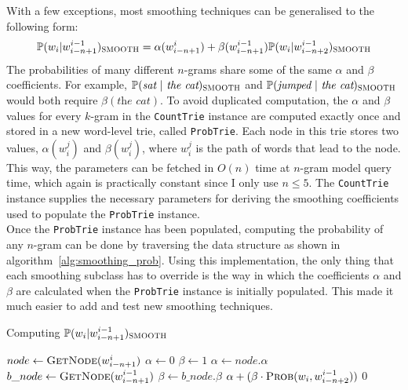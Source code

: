 \documentclass[a4paper, 12pt]{report}
\newcommand{\ttt}[1]{\texttt{#1}}
\newcommand{\tit}[1]{\textit{#1}}
\begin{document}
With a few exceptions, most smoothing techniques can be generalised to the following form:
\begin{gather} \label{eq:smoothing_general}
	\mathbb{P}(w_i | w_{i - n + 1}^{i - 1})_{\text{\scshape SMOOTH}} = \alpha(w_{i - n + 1}^i) + \beta(w_{i - n + 1}^{i - 1})\mathbb{P}(w_i | w_{i - n + 2}^{i - 1})_{\text{\scshape SMOOTH}}
\end{gather}
The probabilities of many different $n$-grams share some of the same $\alpha$ and $\beta$ coefficients. For example, $\mathbb{P}(\tit{sat}\ |\ \tit{the cat})_{\text{\scshape SMOOTH}}$ and $\mathbb{P}(\tit{jumped}\ |\ \tit{the cat})_{\text{\scshape SMOOTH}}$ would both require $\beta(\tit{the cat})$. To avoid duplicated computation, the $\alpha$ and $\beta$ values for every $k$-gram in the \ttt{CountTrie} instance are computed exactly once and stored in a new word-level trie, called \ttt{ProbTrie}. Each node in this trie stores two values, $\alpha(w_i^j)$ and $\beta(w_i^j)$, where $w_i^j$ is the path of words that lead to the node. This way, the parameters can be fetched in $O(n)$ time at $n$-gram model query time, which again is practically constant since I only use $n \leq 5$. The \ttt{CountTrie} instance supplies the necessary parameters for deriving the smoothing coefficients used to populate the \ttt{ProbTrie} instance. \\

Once the \ttt{ProbTrie} instance has been populated, computing the probability of any $n$-gram can be done by traversing the data structure as shown in algorithm~\ref{alg:smoothing_prob}. Using this implementation, the only thing that each smoothing subclass has to override is the way in which the coefficients $\alpha$ and $\beta$ are calculated when the \ttt{ProbTrie} instance is initially populated. This made it much easier to add and test new smoothing techniques.

\begin{algorithm}
\caption{Computing $\mathbb{P}(w_i | w_{i - n + 1}^{i - 1})_{\text{\scshape SMOOTH}}$}
\label{alg:smoothing_prob}
\begin{algorithmic}[1]
	\State $node \gets \text{\scshape GetNode}(w_{i - n + 1}^i)$
	\State $\alpha \gets 0$
	\State $\beta \gets 1$
		\State $\alpha \gets node.\alpha$
	\EndIf
		\State $b\_node \gets \text{\scshape GetNode}(w_{i - n + 1}^{i - 1})$
			\State $\beta \gets b\_node.\beta$
		\EndIf
	\EndIf
	\State \Return $\alpha + (\beta \cdot \text{\scshape Prob}(w_i, w_{i - n + 2}^{i - 1}))$
\EndIf
\State \Return $0$
\EndProcedure
\end{algorithmic}
\end{algorithm}
\end{document}
